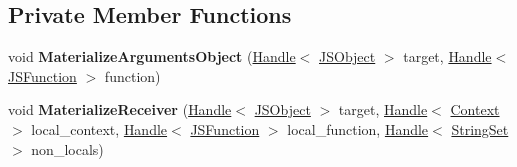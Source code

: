 \subsection*{Private Member Functions}
\begin{DoxyCompactItemize}
\item 
void {\bfseries Materialize\+Arguments\+Object} (\hyperlink{classv8_1_1internal_1_1_handle}{Handle}$<$ \hyperlink{classv8_1_1internal_1_1_j_s_object}{J\+S\+Object} $>$ target, \hyperlink{classv8_1_1internal_1_1_handle}{Handle}$<$ \hyperlink{classv8_1_1internal_1_1_j_s_function}{J\+S\+Function} $>$ function)\hypertarget{classv8_1_1internal_1_1_debug_evaluate_1_1_context_builder_a043f8959d4b371e2dd3be8b3c91ea0c5}{}\label{classv8_1_1internal_1_1_debug_evaluate_1_1_context_builder_a043f8959d4b371e2dd3be8b3c91ea0c5}

\item 
void {\bfseries Materialize\+Receiver} (\hyperlink{classv8_1_1internal_1_1_handle}{Handle}$<$ \hyperlink{classv8_1_1internal_1_1_j_s_object}{J\+S\+Object} $>$ target, \hyperlink{classv8_1_1internal_1_1_handle}{Handle}$<$ \hyperlink{classv8_1_1internal_1_1_context}{Context} $>$ local\+\_\+context, \hyperlink{classv8_1_1internal_1_1_handle}{Handle}$<$ \hyperlink{classv8_1_1internal_1_1_j_s_function}{J\+S\+Function} $>$ local\+\_\+function, \hyperlink{classv8_1_1internal_1_1_handle}{Handle}$<$ \hyperlink{classv8_1_1internal_1_1_string_set}{String\+Set} $>$ non\+\_\+locals)\hypertarget{classv8_1_1internal_1_1_debug_evaluate_1_1_context_builder_a72d435fbc6ae26f191c1e43e51e7562f}{}\label{classv8_1_1internal_1_1_debug_evaluate_1_1_context_builder_a72d435fbc6ae26f191c1e43e51e7562f}

\end{DoxyCompactItemize}
